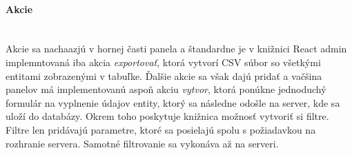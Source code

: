 \paragraph{Akcie}\leavevmode\\
Akcie sa nachaazjú v hornej časti panela a štandardne je v knižnici React admin implemntovaná iba
akcia \textit{exportovať}, ktorá vytvorí CSV súbor so všetkými entitami zobrazenými v tabuľke.
Ďalšie akcie sa však dajú pridať a vačšina panelov má implementovanú aspoň akciu \textit{vytvor},
ktorá ponúkne jednoduchý formulár na vyplnenie údajov entity, ktorý sa následne odošle na server,
kde sa uloží do databázy. Okrem toho poskytuje knižnica možnosť vytvoriť si filtre. Filtre len
pridávajú parametre, ktoré sa posielajú spolu s požiadavkou na rozhranie servera. Samotné
filtrovanie sa vykonáva až na serveri. 

